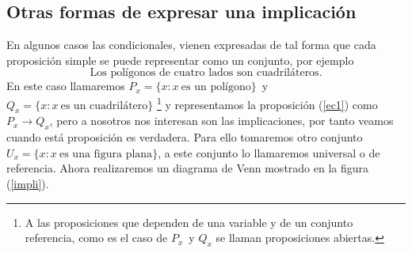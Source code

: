 \subsection{Otras formas de expresar una implicación}
En algunos casos las condicionales, vienen expresadas de tal forma que cada
proposición simple se puede representar como un conjunto, por ejemplo
\begin{equation}
 \mbox{Los polígonos de cuatro lados son cuadriláteros.}
\label{ec1}
\end{equation} 
En este caso llamaremos $P_x=\{x:x\ \mbox{es un polígono}\}$\ y
$Q_x=\{x:x\ \mbox{es un cuadrilátero}\}$ \footnote{A las proposiciones que
dependen de una variable y de un conjunto referencia, como es el caso de $P_x$\
y $Q_x$ se llaman proposiciones abiertas. } y representamos la proposición
(\ref{ec1}) como
$P_x \rightarrow Q_x$, pero a nosotros nos interesan son las implicaciones, por
tanto veamos cuando está proposición es verdadera. Para ello tomaremos otro
conjunto $U_x=\{x:x\ \mbox{es una figura plana}\}$, a este conjunto lo
llamaremos universal o de referencia.
Ahora realizaremos un diagrama de Venn mostrado en la figura (\ref{impli}).

